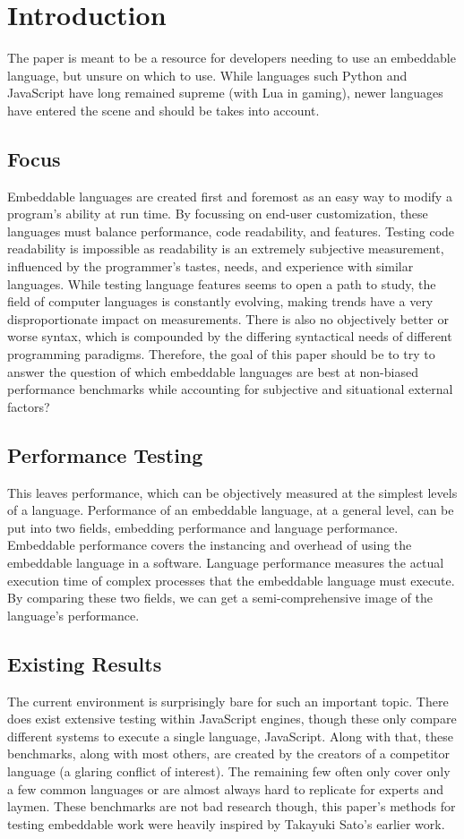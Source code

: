 \section{Introduction} \label{sec:introduction}
The paper is meant to be a resource for developers needing to use an embeddable language, but unsure on which to use. While languages such Python and JavaScript have long remained supreme (with Lua in gaming)\cite{trend:jslua}, newer languages have entered the scene and should be takes into account.

\subsection{Focus}
Embeddable languages are created first and foremost as an easy way to modify a program's ability at run time. By focussing on end-user customization, these languages must balance performance, code readability, and features. Testing code readability is impossible as readability is an extremely subjective measurement, influenced by the programmer's tastes, needs, and experience with similar languages. While testing language features seems to open a path to study, the field of computer languages is constantly evolving, making trends have a very disproportionate impact on measurements. There is also no objectively better or worse syntax, which is compounded by the differing syntactical needs of different programming paradigms. Therefore, the goal of this paper should be to try to answer the question of which embeddable languages are best at non-biased performance benchmarks while accounting for subjective and situational external factors?

\subsection{Performance Testing}
This leaves performance, which can be objectively measured at the simplest levels of a language. Performance of an embeddable language, at a general level, can be put into two fields, embedding performance and language performance. Embeddable performance covers the instancing and overhead of using the embeddable language in a software. Language performance measures the actual execution time of complex processes that the embeddable language must execute. By comparing these two fields, we can get a semi-comprehensive image of the language's performance.

\subsection{Existing Results}
The current environment is surprisingly bare for such an important topic. There does exist extensive testing within JavaScript engines, though these only compare different systems to execute a single language, JavaScript\cite{arewefastyet}. Along with that, these benchmarks, along with most others, are created by the creators of a competitor language (a glaring conflict of interest). The remaining few often only cover only a few common languages or are almost always hard to replicate for experts and laymen. These benchmarks are not bad research though, this paper's methods for testing embeddable work were heavily inspired by Takayuki Sato's earlier work\cite{embench}.
